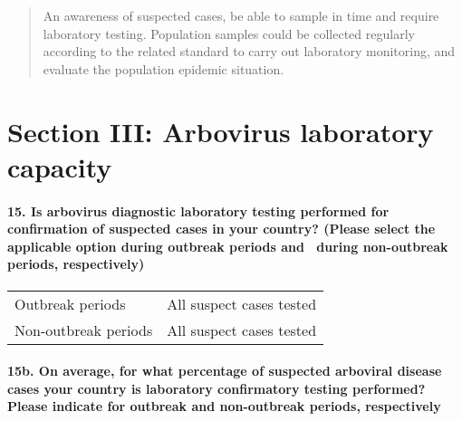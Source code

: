 \documentclass[
]{article}
\begin{document}
\begin{quote}
An awareness of suspected cases, be able to sample in time and require
laboratory testing. Population samples could be collected regularly
according to the related standard to carry out laboratory monitoring,
and evaluate the population epidemic situation.
\end{quote}

\hypertarget{section-iii-arbovirus-laboratory-capacity}{%
\section{Section III: Arbovirus laboratory
capacity}\label{section-iii-arbovirus-laboratory-capacity}}

\hypertarget{is-arbovirus-diagnostic-laboratory-testing-performed-for-confirmation-of-suspected-cases-in-your-country-please-select-the-applicable-option-during-outbreak-periods-and-during-non-outbreak-periods-respectively}{%
\paragraph{15. Is arbovirus diagnostic laboratory testing performed for
confirmation of suspected cases in your country? (Please select the
applicable option during outbreak periods and ~during non-outbreak
periods,
respectively)}\label{is-arbovirus-diagnostic-laboratory-testing-performed-for-confirmation-of-suspected-cases-in-your-country-please-select-the-applicable-option-during-outbreak-periods-and-during-non-outbreak-periods-respectively}}

\begin{longtable}[]{@{}ll@{}}
\toprule
\endhead
Outbreak periods & All suspect cases tested \\
Non-outbreak periods & All suspect cases tested \\
\bottomrule
\end{longtable}

\hypertarget{b.-on-average-for-what-percentage-of-suspected-arboviral-disease-cases-your-country-is-laboratory-confirmatory-testing-performed-please-indicate-for-outbreak-and-non-outbreak-periods-respectively}{%
\paragraph{15b. On average, for what percentage of suspected arboviral
disease cases your country is laboratory confirmatory testing performed?
Please indicate for outbreak and non-outbreak periods,
respectively}\label{b.-on-average-for-what-percentage-of-suspected-arboviral-disease-cases-your-country-is-laboratory-confirmatory-testing-performed-please-indicate-for-outbreak-and-non-outbreak-periods-respectively}}
\end{document}
